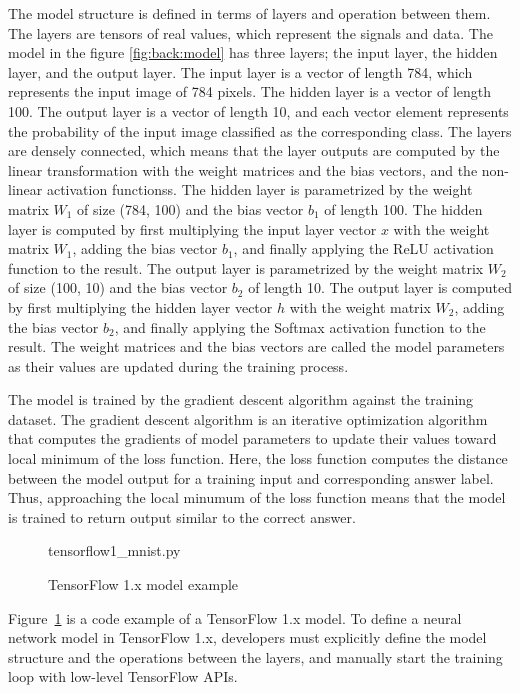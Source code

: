 The model structure is defined in terms of layers and operation between them.
The layers are tensors of real values, which represent the signals and data.
The model in the figure \ref{fig:back:model} has three layers;
the input layer, the hidden layer, and the output layer.
The input layer is a vector of length 784, which represents the input image
of 784 pixels.
The hidden layer is a vector of length 100.
The output layer is a vector of length 10, and each vector element represents 
the probability of the input image classified as the corresponding class.
The layers are densely connected, which means that
the layer outputs are computed by the linear transformation with 
the weight matrices and the bias vectors, 
and the non-linear activation functionss. 
The hidden layer is parametrized by the weight matrix
$W_1$ of size (784, 100) and the bias vector $b_1$ of length 100.
The hidden layer is computed by first multiplying the input layer vector $x$
with the weight matrix $W_1$, adding the bias vector $b_1$, and finally applying
the ReLU activation function to the result.
The output layer is parametrized by the weight matrix $W_2$ of size (100, 10)
and the bias vector $b_2$ of length 10.
The output layer is computed by first multiplying the hidden layer vector $h$
with the weight matrix $W_2$, adding the bias vector $b_2$, and finally applying
the Softmax activation function to the result.
The weight matrices and the bias vectors are called the model parameters 
as their values are updated during the training process.

The model is trained by the gradient descent algorithm against the training
dataset. The gradient descent algorithm is an iterative optimization algorithm
that computes the gradients of model parameters to update their values toward
local minimum of the loss function.
Here, the loss function computes the distance between the model output for
a training input and corresponding answer label.
Thus, approaching the local minumum of the loss function means that the
model is trained to return output similar to the correct answer.


\begin{figure}[ht!]

{tensorflow1_mnist.py}
  \caption{TensorFlow 1.x model example}
\label{fig:back:tf1}
\end{figure}

Figure~\ref{fig:back:tf1} is a code example of a TensorFlow 1.x model.
To define a neural network model in TensorFlow 1.x, 
developers must explicitly define the model structure
and the operations between the layers, 
and manually start the training loop with low-level TensorFlow APIs.

